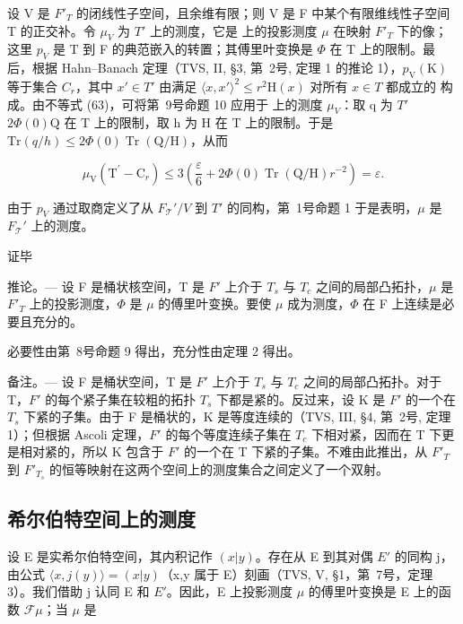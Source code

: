 设 V 是 \(F'_{T}\) 的闭线性子空间，且余维有限；则 V 是 F 中某个有限维线性子空间 T 的正交补。令 \(\mu_{V}\) 为 \(T'\) 上的测度，它是  上的投影测度 \(\mu\) 在映射 \(F'_{T}\) 下的像；这里 \(p_{V}\) 是 T 到 F 的典范嵌入的转置；其傅里叶变换是 \(\Phi\) 在 T 上的限制。最后，根据 Hahn--Banach 定理（TVS, II, §3, 第~2号, 定理 1 的推论 1），\(p_{\mathrm{V}}(\mathrm{K})\) 等于集合 \(C_{r}\)，其中 \(x' \in T'\) 由满足 \(\langle x, x' \rangle^{2} \leqslant r^{2}\mathrm{H}(x)\) 对所有 \(x \in T\) 都成立的  构成。由不等式 (63)，可将第~9号命题 10 应用于  上的测度 \(\mu_{V}\)：取 q 为 \(T'\)\(2\Phi(0)\mathrm{Q}\) 在 T 上的限制，取 h 为 H 在 T 上的限制。于是 \(\mathrm{Tr}(q/h) \leqslant 2\Phi(0)\operatorname{Tr}(\mathrm{Q}/\mathrm{H})\)，从而

\[
\mu_ {\mathrm{V}} \left(\mathrm{T} ^ {\prime} - \mathrm{C} _ {r}\right) \leqslant 3 \left(\frac {\varepsilon}{6} + 2 \Phi (0) \operatorname{Tr} (\mathrm{Q} / \mathrm{H}) r ^ {- 2}\right) = \varepsilon .
\]

由于 \(p_V\) 通过取商定义了从 \(F_{\mathcal{T}}' / V\) 到 \(T'\) 的同构，第~1号命题 1 于是表明，\(\mu\) 是 \(F_{\mathcal{T}}'\) 上的测度。

证毕

推论。--- 设 F 是桶状核空间，T 是 \(F'\) 上介于 \(T_{s}\) 与 \(T_{c}\) 之间的局部凸拓扑，\(\mu\) 是 \(F'_{T}\) 上的投影测度，\(\Phi\) 是 \(\mu\) 的傅里叶变换。要使 \(\mu\) 成为测度，\(\Phi\) 在 F 上连续是必要且充分的。

必要性由第~8号命题 9 得出，充分性由定理 2 得出。

备注。--- 设 F 是桶状空间，T 是 \(F'\) 上介于 \(T_s\) 与 \(T_c\) 之间的局部凸拓扑。对于 T，\(F'\) 的每个紧子集在较粗的拓扑 \(T_s\) 下都是紧的。反过来，设 K 是 \(F'\) 的一个在 \(T_s\) 下紧的子集。由于 F 是桶状的，K 是等度连续的（TVS, III, §4, 第~2号, 定理 1）；但根据 Ascoli 定理，\(F'\) 的每个等度连续子集在 \(T_c\) 下相对紧，因而在 T 下更是相对紧的，所以 K 包含于 \(F'\) 的一个在 T 下紧的子集。不难由此推出，从 \(F'_T\) 到 \(F'_{T_s}\) 的恒等映射在这两个空间上的测度集合之间定义了一个双射。

\subsection{希尔伯特空间上的测度}

设 E 是实希尔伯特空间，其内积记作 \((x|y)\)。存在从 E 到其对偶 \(E'\) 的同构 j，由公式 \(\langle x,j(y)\rangle=(x|y)\)（x,y 属于 E）刻画（TVS, V, §1，第~7号，定理 3）。我们借助 j 认同 E 和 \(E'\)。因此，E 上投影测度 \(\mu\) 的傅里叶变换是 E 上的函数 \(\mathcal{F}\mu\)；当 \(\mu\) 是

